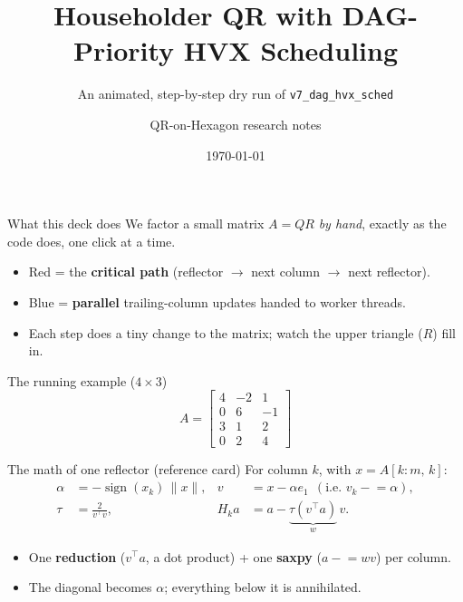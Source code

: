 \documentclass[aspectratio=169,10pt]{beamer}
\title[v7 DAG-HVX QR]{Householder QR with DAG-Priority HVX Scheduling}
\subtitle{An animated, step-by-step dry run of \texttt{v7\_dag\_hvx\_sched}}
\author{QR-on-Hexagon research notes}
\date{\today}
\newcommand{\vt}{v^{\!\top}}
\newcommand{\crit}[1]{\textcolor{critcol}{#1}}
\newcommand{\work}[1]{\textcolor{workcol}{#1}}
\begin{document}
\begin{frame}\titlepage\end{frame}

\begin{frame}{What this deck does}
We factor a small matrix $A=QR$ \emph{by hand}, exactly as the code does, one click
at a time.
\begin{itemize}
  \item \crit{Red} = the \textbf{critical path} (reflector $\to$ next column $\to$ next reflector).
  \item \work{Blue} = \textbf{parallel} trailing-column updates handed to worker threads.
  \item Each step does a tiny change to the matrix; watch the upper triangle ($R$) fill in.
\end{itemize}
\vfill
\begin{block}{The running example ($4\times3$)}
\[
A=\begin{bmatrix} 4&-2&1\\ 0&6&-1\\ 3&1&2\\ 0&2&4\end{bmatrix}
\]
\end{block}
\end{frame}

\begin{frame}{The math of one reflector (reference card)}
For column $k$, with $x=A[k{:}m,\,k]$:
\begin{align*}
\alpha &= -\operatorname{sign}(x_k)\,\lVert x\rVert, &
v &= x-\alpha e_1\ \ (\text{i.e. } v_k \mathrel{-}=\alpha),\\
\tau &= \frac{2}{\vt v}, &
H_k a &= a - \underbrace{\tau(\vt a)}_{w}\,v .
\end{align*}
\begin{itemize}
  \item One \textbf{reduction} ($\vt a$, a dot product) + one \textbf{saxpy} ($a\mathrel{-}=w v$) per column.
  \item The diagonal becomes $\alpha$; everything below it is annihilated.
\end{itemize}
\end{frame}
\end{document}
